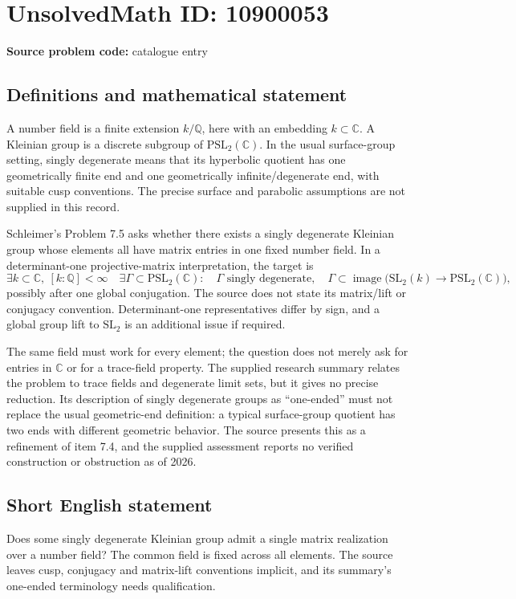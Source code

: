 \documentclass[11pt]{article}
\newcommand{\Q}{\mathbb{Q}}
\newcommand{\C}{\mathbb{C}}
\begin{document}
\section*{UnsolvedMath ID: 10900053}
\textbf{Source problem code:} catalogue entry
\subsection{Definitions and mathematical statement}
A number field is a finite extension \(k/\Q\), here with an embedding \(k\subset\C\). A Kleinian group is a discrete subgroup of \(\mathrm{PSL}_2(\C)\). In the usual surface-group setting, singly degenerate means that its hyperbolic quotient has one geometrically finite end and one geometrically infinite/degenerate end, with suitable cusp conventions. The precise surface and parabolic assumptions are not supplied in this record.

Schleimer's Problem 7.5 asks whether there exists a singly degenerate Kleinian group whose elements all have matrix entries in one fixed number field. In a determinant-one projective-matrix interpretation, the target is
\[
 \exists k\subset\C,\ [k:\Q]<\infty\quad
 \exists\Gamma\subset\mathrm{PSL}_2(\C):\quad
 \Gamma\text{ singly degenerate},\quad
 \Gamma\subset\operatorname{image}\bigl(\mathrm{SL}_2(k)
                          \to\mathrm{PSL}_2(\C)\bigr),
\]
possibly after one global conjugation. The source does not state its matrix/lift or conjugacy convention. Determinant-one representatives differ by sign, and a global group lift to \(\mathrm{SL}_2\) is an additional issue if required.

The same field must work for every element; the question does not merely ask for entries in \(\C\) or for a trace-field property. The supplied research summary relates the problem to trace fields and degenerate limit sets, but it gives no precise reduction. Its description of singly degenerate groups as ``one-ended'' must not replace the usual geometric-end definition: a typical surface-group quotient has two ends with different geometric behavior. The source presents this as a refinement of item 7.4, and the supplied assessment reports no verified construction or obstruction as of 2026.
\subsection{Short English statement}
Does some singly degenerate Kleinian group admit a single matrix realization over a number field? The common field is fixed across all elements. The source leaves cusp, conjugacy and matrix-lift conventions implicit, and its summary's one-ended terminology needs qualification.
\end{document}
